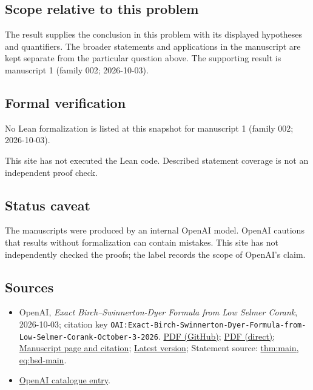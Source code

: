\documentclass[11pt]{article}
\begin{document}
\subsection{Scope relative to this problem}
The result supplies the conclusion in this problem with its displayed hypotheses and quantifiers. The broader statements and applications in the manuscript are kept separate from the particular question above. The supporting result is manuscript 1 (family 002; 2026-10-03).

\subsection{Formal verification}
No Lean formalization is listed at this snapshot for manuscript 1 (family 002; 2026-10-03).

This site has not executed the Lean code. Described statement coverage is not an independent proof check.

\subsection{Status caveat}
The manuscripts were produced by an internal OpenAI model. OpenAI cautions that results without formalization can contain mistakes. This site has not independently checked the proofs; the label records the scope of OpenAI's claim.

\subsection{Sources}
\begin{itemize}
\item OpenAI, \emph{Exact Birch–Swinnerton-Dyer Formula from Low Selmer Corank}, 2026-10-03; citation key \texttt{OAI:Exact-Birch-Swinnerton-Dyer-Formula-from-Low-Selmer-Corank-October-3-2026}. \href{https://github.com/openai/math/blob/adc7f1241b42e322a6451854ab7e4b4c146bf78a/preprints/Exact-Birch-Swinnerton-Dyer-Formula-from-Low-Selmer-Corank-October-3-2026/exact-bsd-low-selmer-corank.pdf}{PDF (GitHub)}; \href{https://github.com/openai/math/raw/adc7f1241b42e322a6451854ab7e4b4c146bf78a/preprints/Exact-Birch-Swinnerton-Dyer-Formula-from-Low-Selmer-Corank-October-3-2026/exact-bsd-low-selmer-corank.pdf}{PDF (direct)}; \href{https://github.com/openai/math/blob/adc7f1241b42e322a6451854ab7e4b4c146bf78a/preprints/Exact-Birch-Swinnerton-Dyer-Formula-from-Low-Selmer-Corank-October-3-2026/README.md}{Manuscript page and citation}; \href{https://github.com/openai/math/blob/main/preprints/Exact-Birch-Swinnerton-Dyer-Formula-from-Low-Selmer-Corank-October-3-2026/exact-bsd-low-selmer-corank.pdf}{Latest version}; Statement source: \href{https://github.com/openai/math/blob/adc7f1241b42e322a6451854ab7e4b4c146bf78a/preprints/Exact-Birch-Swinnerton-Dyer-Formula-from-Low-Selmer-Corank-October-3-2026/build/sections/01-introduction.tex\#L47}{thm:main, eq:bsd-main}.
\item \href{https://github.com/openai/math/blob/adc7f1241b42e322a6451854ab7e4b4c146bf78a/CONTENTS.md}{OpenAI catalogue entry}.
\end{itemize}
\end{document}
